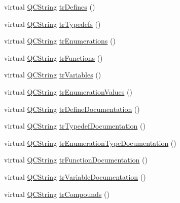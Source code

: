 \begin{DoxyCompactItemize}
\item 
virtual \mbox{\hyperlink{class_q_c_string}{Q\+C\+String}} \mbox{\hyperlink{class_translator_serbian_cyrillic_a64840de5ab1afda63a8d4e0c4de6c171}{tr\+Defines}} ()
\item 
virtual \mbox{\hyperlink{class_q_c_string}{Q\+C\+String}} \mbox{\hyperlink{class_translator_serbian_cyrillic_ac2806caaf5382b8b2c5ed3b2681ef2ec}{tr\+Typedefs}} ()
\item 
virtual \mbox{\hyperlink{class_q_c_string}{Q\+C\+String}} \mbox{\hyperlink{class_translator_serbian_cyrillic_a895e64ba1a9aede0bc925e09a5c5b449}{tr\+Enumerations}} ()
\item 
virtual \mbox{\hyperlink{class_q_c_string}{Q\+C\+String}} \mbox{\hyperlink{class_translator_serbian_cyrillic_a1f0b8b32aaed2270bf454c4ee6c27e39}{tr\+Functions}} ()
\item 
virtual \mbox{\hyperlink{class_q_c_string}{Q\+C\+String}} \mbox{\hyperlink{class_translator_serbian_cyrillic_a5114b32a6afc596463b20c2aaf04f530}{tr\+Variables}} ()
\item 
virtual \mbox{\hyperlink{class_q_c_string}{Q\+C\+String}} \mbox{\hyperlink{class_translator_serbian_cyrillic_a85bb90af627cf0c401b6660fa21510ce}{tr\+Enumeration\+Values}} ()
\item 
virtual \mbox{\hyperlink{class_q_c_string}{Q\+C\+String}} \mbox{\hyperlink{class_translator_serbian_cyrillic_a8fb5969803e5ab5bfeddcd9400e83c2c}{tr\+Define\+Documentation}} ()
\item 
virtual \mbox{\hyperlink{class_q_c_string}{Q\+C\+String}} \mbox{\hyperlink{class_translator_serbian_cyrillic_a20b95cb23623637834459e27a3a47fdc}{tr\+Typedef\+Documentation}} ()
\item 
virtual \mbox{\hyperlink{class_q_c_string}{Q\+C\+String}} \mbox{\hyperlink{class_translator_serbian_cyrillic_a84a8e172afd5948ae3e9d945b86c54ef}{tr\+Enumeration\+Type\+Documentation}} ()
\item 
virtual \mbox{\hyperlink{class_q_c_string}{Q\+C\+String}} \mbox{\hyperlink{class_translator_serbian_cyrillic_a1da3a2e14b6aff18ef2f76e97cf3d685}{tr\+Function\+Documentation}} ()
\item 
virtual \mbox{\hyperlink{class_q_c_string}{Q\+C\+String}} \mbox{\hyperlink{class_translator_serbian_cyrillic_a3efb02fc5cfd12aa212de984f3ddb59b}{tr\+Variable\+Documentation}} ()
\item 
virtual \mbox{\hyperlink{class_q_c_string}{Q\+C\+String}} \mbox{\hyperlink{class_translator_serbian_cyrillic_a2e7125c02a430c5e9a401e162108992f}{tr\+Compounds}} ()

\end{DoxyCompactItemize}
